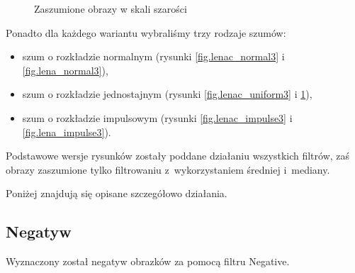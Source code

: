 \documentclass{classrep}
\begin{document}
\begin{figure}
{{  \label{fig.lena_uniform3}
 }
}
\caption{Zaszumione obrazy w skali szarości}
\end{figure}

Ponadto dla każdego wariantu wybraliśmy trzy rodzaje szumów:
\begin{itemize}
 \item szum o rozkładzie normalnym (rysunki \ref{fig.lenac_normal3} i \ref{fig.lena_normal3}),
 \item szum o rozkładzie jednostajnym (rysunki \ref{fig.lenac_uniform3} i \ref{fig.lena_uniform3}),
 \item szum o rozkładzie impulsowym (rysunki \ref{fig.lenac_impulse3} i \ref{fig.lena_impulse3}).
\end{itemize}

Podstawowe wersje rysunków zostały poddane działaniu wszystkich filtrów, zaś obrazy zaszumione tylko filtrowaniu z~wykorzystaniem średniej i~mediany.

Poniżej znajdują się opisane szczegółowo działania.

\subsection{Negatyw}
\label{sec.tests.negative}
Wyznaczony został negatyw obrazków za pomocą filtru Negative.
\end{document}
